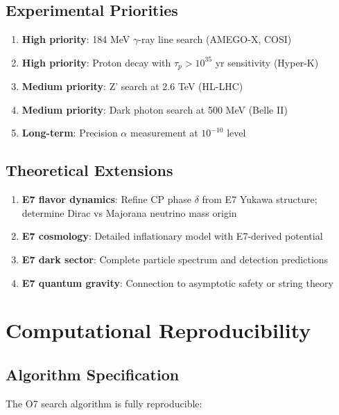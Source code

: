 \documentclass[11pt,a4paper]{article}
\begin{document}
\subsection{Experimental Priorities}

\begin{enumerate}
\item \textbf{High priority}: 184 MeV $\gamma$-ray line search (AMEGO-X, COSI)
\item \textbf{High priority}: Proton decay with $\tau_p > 10^{35}$ yr sensitivity (Hyper-K)
\item \textbf{Medium priority}: Z' search at 2.6 TeV (HL-LHC)
\item \textbf{Medium priority}: Dark photon search at 500 MeV (Belle II)
\item \textbf{Long-term}: Precision $\alpha$ measurement at $10^{-10}$ level
\end{enumerate}

\subsection{Theoretical Extensions}

\begin{enumerate}
\item \textbf{E7 flavor dynamics}: Refine CP phase $\delta$ from E7 Yukawa structure; determine Dirac vs Majorana neutrino mass origin
\item \textbf{E7 cosmology}: Detailed inflationary model with E7-derived potential
\item \textbf{E7 dark sector}: Complete particle spectrum and detection predictions
\item \textbf{E7 quantum gravity}: Connection to asymptotic safety or string theory
\end{enumerate}

\section{Computational Reproducibility}

\subsection{Algorithm Specification}

The O7 search algorithm is fully reproducible:
\end{document}
